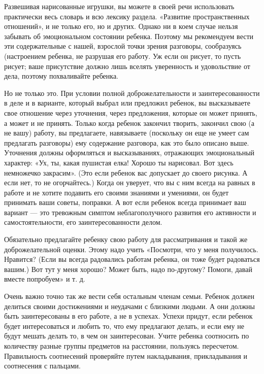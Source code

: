 \documentclass{book}
\begin{document}
Развешивая нарисованные игрушки, вы можете в своей речи использовать
практически весь словарь и всю лексику раздела. «Развитие
пространственных отношений», и не только его, но и других. Однако ни в
коем случае нельзя забывать об эмоциональном состоянии ребенка. Поэтому
мы рекомендуем вести эти содержательные с нашей, взрослой точки зрения
разговоры, сообразуясь (настроением ребенка, не разрушая его работу. Уж
если он рисует, то пусть рисует; ваше присутствие должно лишь вселять
уверенность и удовольствие от дела, поэтому похваливайте ребенка.

Но не только это. При условии полной доброжелательности и
заинтересованности в деле и в варианте, который выбрал или предложил
ребенок, вы высказываете свое отношение через уточнения, через
предложения, которые он может принять, а может и не принять. Только
когда ребенок закончил творить, закончил свою (а не вашу) работу, вы
предлагаете, навязываете (поскольку он еще не умеет сам предлагать
разговоры) ему содержание разговора, как это было описано выше.
Уточнения должны оформляться и высказываниях, отражающих эмоциональный
характер: «Ух, ты, какая пушистая елка! Хорошо ты нарисовал. Вот здесь
немножечко закрасим». (Это если ребенок вас допускает до своего рисунка.
А если нет, то не огорчайтесь.) Когда он уверует, что вы с ним всегда на
равных в работе и не хотите подавить его своими знаниями и умениями, он
будет принимать ваши советы, поправки. А вот если ребенок всегда
принимает ваш вариант --- это тревожным симптом неблагополучного
развития его активности и самостоятельности, его заинтересованности
делом.

Обязательно предлагайте ребенку свою работу для рассматривания и такой
же доброжелательной оценки. Этому надо учить «Посмотри, что у меня
получилось. Нравится? (Если вы всегда радовались работам ребенка, он
тоже будет радоваться вашим.) Вот тут у меня хорошо? Может быть, надо
по-другому? Помоги, давай вместе попробуем» и т. д.

Очень важно точно так же вести себя остальным членам семьи. Ребенок
должен делиться своими достижениями и неудачами с близкими людьми. А они
должны быть заинтересованы в его работе, а не в успехах. Успехи придут,
если ребенок будет интересоваться и любить то, что ему предлагают
делать, и если ему не будут мешать делать то, в чем он заинтересован.
Учите ребенка соотносить по количеству разные группы предметов на
расстоянии, пользуясь пересчетом. Правильность соотнесений проверяйте
путем накладывания, прикладывания и соотнесения с пальцами.
\end{document}

